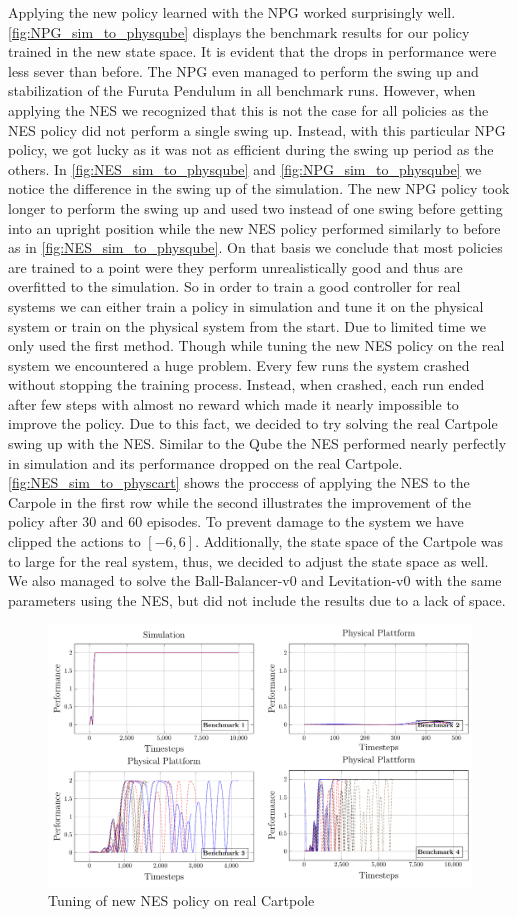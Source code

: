 Applying the new policy learned with the NPG worked surprisingly well. \autoref{fig:NPG_sim_to_physqube} displays the benchmark results for our policy trained in the new state space. It is evident that the drops in performance were less sever than before. The NPG even managed to perform the swing up and stabilization of the Furuta Pendulum in all benchmark runs. However, when applying the NES we recognized that this is not the case for all policies as the NES policy did not perform a single swing up. Instead, with this particular NPG policy, we got lucky as it was not as efficient during the swing up period as the others. In \autoref{fig:NES_sim_to_physqube} and \ref{fig:NPG_sim_to_physqube} we notice the difference in the swing up of the simulation. The new NPG policy took longer to perform the swing up and used two instead of one swing before getting into an upright position while the new NES policy performed similarly to before as in \autoref{fig:NES_sim_to_physqube}. On that basis we conclude that most policies are trained to a point were they perform unrealistically good and thus are overfitted to the simulation.
So in order to train a good controller for real systems we can either train a policy in simulation and tune it on the physical system or train on the physical system from the start. Due to limited time we only used the first method.
Though while tuning the new NES policy on the real system we encountered a huge problem. Every few runs the system crashed without stopping the training process. Instead, when crashed, each run ended after few steps with almost no reward which made it nearly impossible to improve the policy. Due to this fact, we decided to try solving the real Cartpole swing up with the NES. Similar to the Qube the NES performed nearly perfectly in simulation and its performance dropped on the real Cartpole. \autoref{fig:NES_sim_to_physcart} shows the proccess of applying the NES to the Carpole in the first row while the second illustrates the improvement of the policy after 30 and 60 episodes. To prevent damage to the system we have clipped the actions to $[-6, 6]$. Additionally, the state space of the Cartpole was to large for the real system, thus, we decided to adjust the state space as well. We also managed to solve the Ball-Balancer-v0 and Levitation-v0 with the same parameters using the NES, but did not include the results due to a lack of space.
\begin{figure}
\centering
\includegraphics[scale=.5]{plots/training_on_rr.pdf}
\caption{Tuning of new NES policy on real Cartpole}
\label{fig:NES_sim_to_physcart}
\end{figure}
